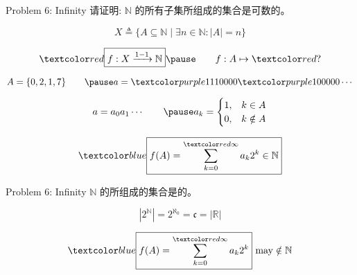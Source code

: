 
\begin{frame}{}
  \begin{exampleblock}{Problem 6: Infinity}
    请证明: $\mathbb{N}$ 的所有子集所组成的集合是可数的。
  \end{exampleblock}

  \pause
  \[
    X \triangleq \Big\{A \subseteq \mathbb{N} \mid \exists n \in \mathbb{N}: |A| = n\Big\}
  \]

  \pause
  \[
    \red{\boxed{f: X \xrightarrow{1-1} \mathbb{N}}}
    \pause \qquad f: A \mapsto \red{?}
  \]

  \pause
  \vspace{-0.30cm}
  \[
    A = \set{0, 2, 1, 7} \qquad \pause a = \purple{111}0000\purple{1}00000\cdots
  \]

  \pause
  \vspace{-0.30cm}
  \[
    a = a_0 a_1 \cdots \qquad \pause
    a_{k} = \begin{cases}
      1, & k \in A \\
      0, & k \notin A
    \end{cases}
  \]

  \pause
  \vspace{-0.30cm}
  \[
    \blue{\boxed{f(A) = \sum_{k=0}^{\red{\infty}} a_{k} 2^{k} \in \mathbb{N}}}
  \]
\end{frame}

\begin{frame}{}
  \begin{exampleblock}{Problem 6: Infinity}
    $\mathbb{N}$ 的所组成的集合是的。
  \end{exampleblock}

  \pause
  \[
    |2^{\mathbb{N}}| = 2^{\aleph_{0}} = \mathfrak{c} = |\mathbb{R}|
  \]
  
  \pause

  \pause
  \vspace{-0.30cm}
  \[
    \blue{\boxed{f(A) = \sum_{k=0}^{\red{\infty}} a_{k} 2^{k}}} \text{ may} \notin \mathbb{N}
  \]
\end{frame}
